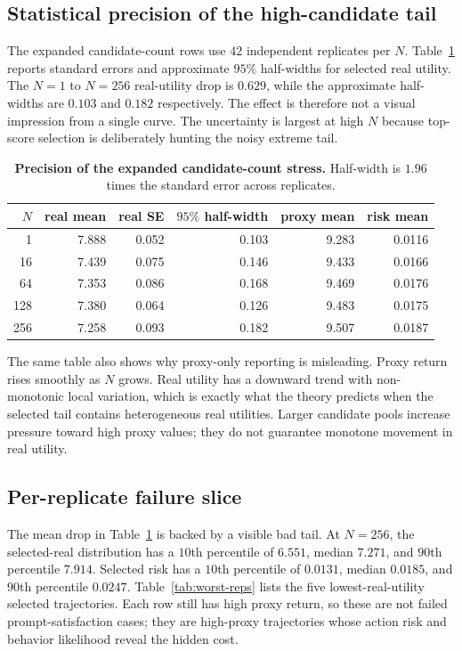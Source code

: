 \subsection{Statistical precision of the high-candidate tail}

The expanded candidate-count rows use $42$ independent replicates per $N$. Table~\ref{tab:tail-ci} reports standard errors and approximate $95\%$ half-widths for selected real utility. The $N=1$ to $N=256$ real-utility drop is $0.629$, while the approximate half-widths are $0.103$ and $0.182$ respectively. The effect is therefore not a visual impression from a single curve. The uncertainty is largest at high $N$ because top-score selection is deliberately hunting the noisy extreme tail.

\begin{table}[t]
\centering
\small
\caption{\textbf{Precision of the expanded candidate-count stress.} Half-width is $1.96$ times the standard error across replicates.}
\label{tab:tail-ci}
\begin{tabular}{rrrrrr}
\toprule
$N$ & real mean & real SE & $95\%$ half-width & proxy mean & risk mean \\
\midrule
1 & 7.888 & 0.052 & 0.103 & 9.283 & 0.0116 \\
16 & 7.439 & 0.075 & 0.146 & 9.433 & 0.0166 \\
64 & 7.353 & 0.086 & 0.168 & 9.469 & 0.0176 \\
128 & 7.380 & 0.064 & 0.126 & 9.483 & 0.0175 \\
256 & 7.258 & 0.093 & 0.182 & 9.507 & 0.0187 \\
\bottomrule
\end{tabular}
\end{table}

The same table also shows why proxy-only reporting is misleading. Proxy return rises smoothly as $N$ grows. Real utility has a downward trend with non-monotonic local variation, which is exactly what the theory predicts when the selected tail contains heterogeneous real utilities. Larger candidate pools increase pressure toward high proxy values; they do not guarantee monotone movement in real utility.

\subsection{Per-replicate failure slice}

The mean drop in Table~\ref{tab:tail-ci} is backed by a visible bad tail. At $N=256$, the selected-real distribution has a $10$th percentile of $6.551$, median $7.271$, and $90$th percentile $7.914$. Selected risk has a $10$th percentile of $0.0131$, median $0.0185$, and $90$th percentile $0.0247$. Table~\ref{tab:worst-reps} lists the five lowest-real-utility selected trajectories. Each row still has high proxy return, so these are not failed prompt-satisfaction cases; they are high-proxy trajectories whose action risk and behavior likelihood reveal the hidden cost.


